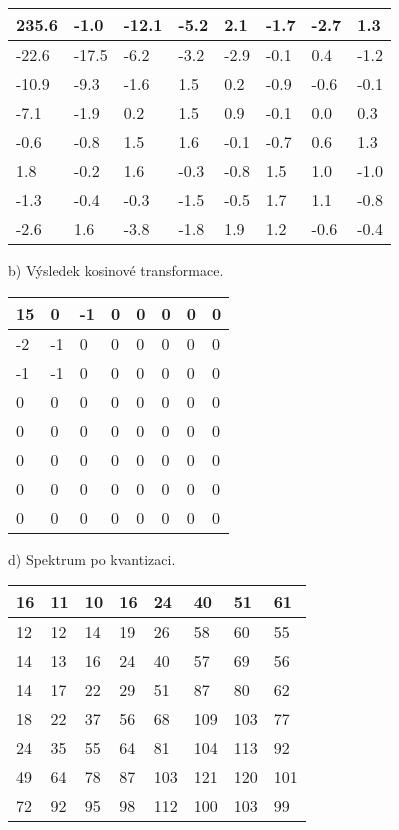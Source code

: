 \begin{tabular}{|p{0.2in}|p{0.2in}|p{0.2in}|p{0.2in}|p{0.2in}|p{0.2in}|p{0.2in}|p{0.2in}|} \hline 
235.6 & -1.0 & -12.1 & -5.2 & 2.1 & -1.7 & -2.7 & 1.3 \\ \hline 
-22.6 & -17.5 & -6.2 & -3.2 & -2.9 & -0.1 & 0.4 & -1.2 \\ \hline 
-10.9 & -9.3 & -1.6 & 1.5 & 0.2 & -0.9 & -0.6 & -0.1 \\ \hline 
-7.1 & -1.9 & 0.2 & 1.5 & 0.9 & -0.1 & 0.0 & 0.3 \\ \hline 
-0.6 & -0.8 & 1.5 & 1.6 & -0.1 & -0.7 & 0.6 & 1.3 \\ \hline 
1.8 & -0.2 & 1.6 & -0.3 & -0.8 & 1.5 & 1.0 & -1.0 \\ \hline 
-1.3 & -0.4 & -0.3 & -1.5 & -0.5 & 1.7 & 1.1 & -0.8 \\ \hline 
-2.6 & 1.6 & -3.8 & -1.8 & 1.9 & 1.2 & -0.6 & -0.4 \\ \hline 
\end{tabular}

b) Výsledek kosinové transformace.

\begin{tabular}{|p{0.2in}|p{0.2in}|p{0.2in}|p{0.2in}|p{0.2in}|p{0.2in}|p{0.2in}|p{0.2in}|} \hline 
15 & 0 & -1 & 0 & 0 & 0 & 0 & 0 \\ \hline 
-2 & -1 & 0 & 0 & 0 & 0 & 0 & 0 \\ \hline 
-1 & -1 & 0 & 0 & 0 & 0 & 0 & 0 \\ \hline 
0 & 0 & 0 & 0 & 0 & 0 & 0 & 0 \\ \hline 
0 & 0 & 0 & 0 & 0 & 0 & 0 & 0 \\ \hline 
0 & 0 & 0 & 0 & 0 & 0 & 0 & 0 \\ \hline 
0 & 0 & 0 & 0 & 0 & 0 & 0 & 0 \\ \hline 
0 & 0 & 0 & 0 & 0 & 0 & 0 & 0 \\ \hline 
\end{tabular}

d) Spektrum po kvantizaci.

\begin{tabular}{|p{0.2in}|p{0.2in}|p{0.2in}|p{0.2in}|p{0.2in}|p{0.2in}|p{0.2in}|p{0.2in}|} \hline 
16 & 11 & 10 & 16 & 24 & 40 & 51 & 61 \\ \hline 
12 & 12 & 14 & 19 & 26 & 58 & 60 & 55 \\ \hline 
14 & 13 & 16 & 24 & 40 & 57 & 69 & 56 \\ \hline 
14 & 17 & 22 & 29 & 51 & 87 & 80 & 62 \\ \hline 
18 & 22 & 37 & 56 & 68 & 109 & 103 & 77 \\ \hline 
24 & 35 & 55 & 64 & 81 & 104 & 113 & 92 \\ \hline 
49 & 64 & 78 & 87 & 103 & 121 & 120 & 101 \\ \hline 
72 & 92 & 95 & 98 & 112 & 100 & 103 & 99 \\ \hline 
\end{tabular}

